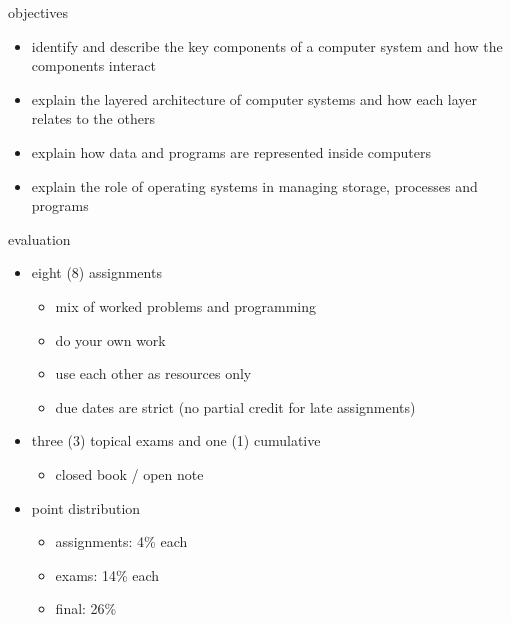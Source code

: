 \documentclass[10pt,t,usenames,dvipsnames]{beamer}
\begin{document}
  \begin{frame}{objectives}
    \begin{itemize}[itemsep=10pt]
      \item identify and describe the key components of a computer system and
        how the components interact
      \item explain the layered architecture of computer systems and how each
        layer relates to the others
      \item explain how data and programs are represented inside computers
      \item explain the role of operating systems in managing storage, processes
        and programs
    \end{itemize}
  \end{frame}

  \begin{frame}{evaluation}
    \begin{itemize}[itemsep=10pt]
      \item eight (8) assignments
        \begin{itemize}[label=\cdot]
          \item mix of worked problems and programming
          \item do your own work
          \item use each other as resources only
          \item due dates are strict (no partial credit for late assignments)
        \end{itemize}
      \item three (3) topical exams and one (1) cumulative
        \begin{itemize}[label=\cdot]
          \item closed book / open note
        \end{itemize}
      \item point distribution
        \begin{itemize}
          \item assignments: 4\% each
          \item exams: 14\% each
          \item final: 26\%
        \end{itemize}
    \end{itemize}

  \end{frame}
\end{document}
